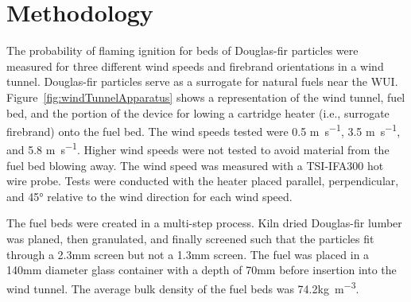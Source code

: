 \section{Methodology}
\label{sec:methods2}
    The probability of flaming ignition for beds of Douglas-fir particles were measured for three different wind speeds and firebrand orientations in a wind tunnel. Douglas-fir particles serve as a surrogate for natural fuels near the WUI. Figure~\ref{fig:windTunnelApparatus} shows a representation of the wind tunnel, fuel bed, and the portion of the device for lowing a cartridge heater (i.e., surrogate firebrand) onto the fuel bed.  The wind speeds tested were 0.5 \si{\meter\per\second}, 3.5 \si{\meter\per\second}, and 5.8 \si{\meter\per\second}. Higher wind speeds were not tested to avoid material from the fuel bed blowing away. The wind speed was measured with a TSI-IFA300 hot wire probe. Tests were conducted with the heater placed parallel, perpendicular, and 45\si{\degree} relative to the wind direction for each wind speed. 

    
    The fuel beds were created in a multi-step process. Kiln dried Douglas-fir lumber was planed, then granulated, and finally screened such that the particles fit through a 2.3\si{\milli\meter} screen but not a 1.3\si{\milli\meter} screen. The fuel was placed in a 140\si{\milli\meter} diameter glass container with a depth of 70\si{\milli\meter} before insertion into the wind tunnel. The average bulk density of the fuel beds was 74.2\si{\kilo\gram\per\cubic\meter}.   
    
